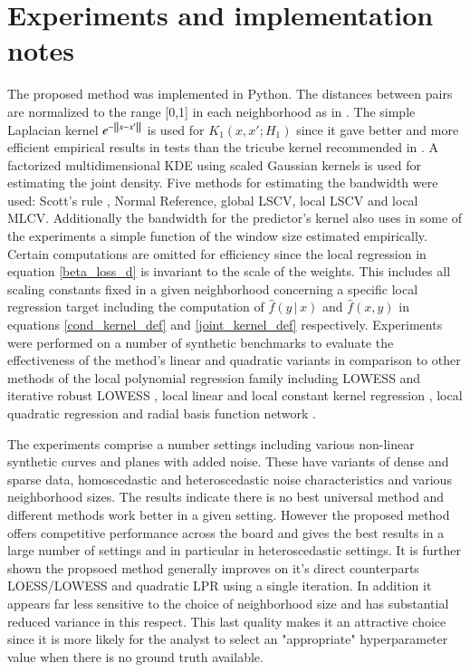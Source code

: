 \documentclass[preprint,1p,times]{elsarticle}
\begin{document}
\section{Experiments and implementation notes}
\label{S:Experiments and implementation notes}
The proposed method was implemented in Python. The distances between pairs are normalized to the range [0,1] in each neighborhood as in \citep{clevland79}. The simple Laplacian kernel $e^{- \, \norm{x-x'}}$ is used for $K_1(x,x';H_1)$ since it gave better and more efficient empirical results in tests than the tricube kernel recommended in \citep{clevland79}. A factorized multidimensional KDE using scaled Gaussian kernels is used for estimating the joint density. Five methods for estimating the bandwidth were used: Scott's rule \cite{scott2015multivariate}, Normal Reference, global LSCV,  local LSCV and local MLCV. Additionally the bandwidth for the predictor's kernel also uses in some of the experiments a simple function of the window size estimated empirically. Certain computations are omitted for efficiency since the local regression in equation \eqref{beta_loss_d} is invariant to the scale of the weights. This includes all scaling constants fixed in a given neighborhood concerning a specific local regression target including the computation of $\hat{f}(y \, | \, x)$ and $\hat{f}(x,y)$ in equations \eqref{cond_kernel_def} and \eqref{joint_kernel_def} respectively. Experiments were performed on a number of synthetic benchmarks to evaluate the effectiveness of the method's linear and quadratic variants in comparison to other methods of the local polynomial regression family including LOWESS and iterative robust LOWESS \cite{seabold2010statsmodels}, local linear and local constant kernel regression \cite{seabold2010statsmodels}, local quadratic regression \cite{localreg} and radial basis function network \cite{localreg}. \newline

The experiments comprise a number settings including various non-linear synthetic curves and planes with added noise. These have variants of dense and sparse data, homoscedastic and heteroscedastic noise characteristics and various neighborhood sizes. The results indicate there is no best universal method and different methods work better in a given setting. However the proposed method offers competitive performance across the board and gives the best results in a large number of settings and in particular in heteroscedastic settings. It is further shown the propsoed method generally improves on it's direct counterparts LOESS/LOWESS and quadratic LPR using a single iteration. In addition it appears far less sensitive to the choice of neighborhood size and has substantial reduced variance in this respect. This last quality makes it an attractive choice since it is more likely for the analyst to select an "appropriate" hyperparameter value when there is no ground truth available.
\end{document}
